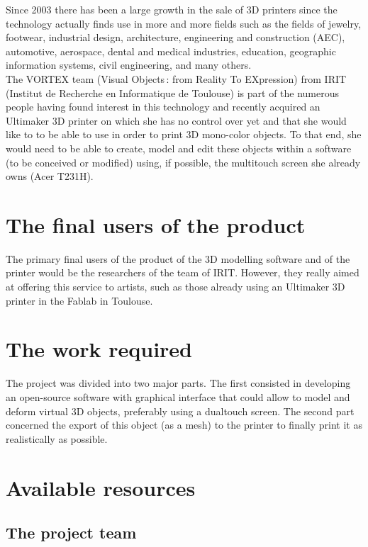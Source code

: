 \documentclass{report}
\begin{document}
	Since 2003 there has been a large growth in the sale of 3D printers since the technology actually finds use in more and more fields such as the fields of jewelry, footwear, industrial design, architecture, engineering and construction (AEC), automotive, aerospace, dental and medical industries, education, geographic information systems, civil engineering, and many others.\\

	The VORTEX team (Visual Objects : from Reality To EXpression) from IRIT (Institut de Recherche en Informatique de Toulouse) is part of the numerous people having found interest in this technology and recently acquired an Ultimaker 3D printer on which she has no control over yet and that she would like to to be able to use in order to print 3D mono-color objects. To that end, she would need to be able to create, model and edit these objects within a software (to be conceived or modified) using, if possible, the multitouch screen she already owns (Acer T231H).\\

\section{The final users of the product}

	The primary final users of the product of the 3D modelling software and of the printer would be the researchers of the team of IRIT. However, they really aimed at offering this service to artists, such as those already using an Ultimaker 3D printer in the Fablab in Toulouse.

\section{The work required}

	The project was divided into two major parts. The first consisted in developing an open-source software with graphical interface that could allow to model and deform virtual 3D objects, preferably using a dualtouch screen. The second part concerned the export of this object (as a mesh) to the printer to finally print it as realistically as possible.

\section{Available resources}

\subsection{The project team}
\end{document}
